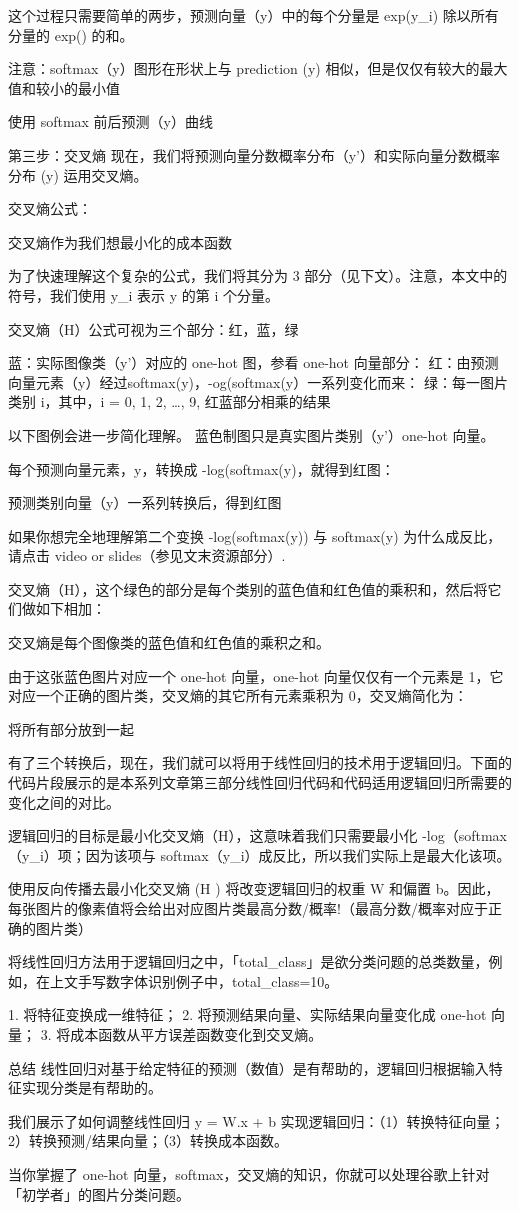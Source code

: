 \documentclass[11pt]{book} %
\begin{document}
这个过程只需要简单的两步，预测向量（y）中的每个分量是 exp(y\_i) 除以所有分量的 exp() 的和。


注意：softmax（y）图形在形状上与 prediction (y) 相似，但是仅仅有较大的最大值和较小的最小值


使用 softmax 前后预测（y）曲线 

第三步：交叉熵
现在，我们将预测向量分数概率分布（y'）和实际向量分数概率分布 (y) 运用交叉熵。

交叉熵公式：

交叉熵作为我们想最小化的成本函数 

为了快速理解这个复杂的公式，我们将其分为 3 部分（见下文）。注意，本文中的符号，我们使用 y\_i 表示 y 的第 i 个分量。


交叉熵（H）公式可视为三个部分：红，蓝，绿 

蓝：实际图像类（y'）对应的 one-hot 图，参看 one-hot 向量部分：
红：由预测向量元素（y）经过softmax(y)，-og(softmax(y）一系列变化而来：
绿：每一图片类别 i，其中，i = 0, 1, 2, …, 9, 红蓝部分相乘的结果

以下图例会进一步简化理解。
蓝色制图只是真实图片类别（y'）one-hot 向量。


每个预测向量元素，y，转换成 -log(softmax(y)，就得到红图：

预测类别向量（y）一系列转换后，得到红图 

如果你想完全地理解第二个变换 -log(softmax(y)) 与 softmax(y) 为什么成反比，请点击 video or slides（参见文末资源部分）.

交叉熵（H），这个绿色的部分是每个类别的蓝色值和红色值的乘积和，然后将它们做如下相加：

交叉熵是每个图像类的蓝色值和红色值的乘积之和。 

由于这张蓝色图片对应一个 one-hot 向量，one-hot 向量仅仅有一个元素是 1，它对应一个正确的图片类，交叉熵的其它所有元素乘积为 0，交叉熵简化为：


将所有部分放到一起

有了三个转换后，现在，我们就可以将用于线性回归的技术用于逻辑回归。下面的代码片段展示的是本系列文章第三部分线性回归代码和代码适用逻辑回归所需要的变化之间的对比。

逻辑回归的目标是最小化交叉熵（H），这意味着我们只需要最小化 -log（softmax（y\_i）项；因为该项与 softmax（y\_i）成反比，所以我们实际上是最大化该项。

使用反向传播去最小化交叉熵 (H ) 将改变逻辑回归的权重 W 和偏置 b。因此，每张图片的像素值将会给出对应图片类最高分数/概率!（最高分数/概率对应于正确的图片类）

将线性回归方法用于逻辑回归之中，「total\_class」是欲分类问题的总类数量，例如，在上文手写数字体识别例子中，total\_class=10。 

1. 将特征变换成一维特征；
2. 将预测结果向量、实际结果向量变化成 one-hot 向量；
3. 将成本函数从平方误差函数变化到交叉熵。


总结 
线性回归对基于给定特征的预测（数值）是有帮助的，逻辑回归根据输入特征实现分类是有帮助的。

我们展示了如何调整线性回归 y = W.x + b 实现逻辑回归：（1）转换特征向量；2）转换预测/结果向量；（3）转换成本函数。

当你掌握了 one-hot 向量，softmax，交叉熵的知识，你就可以处理谷歌上针对「初学者」的图片分类问题。
\end{document}
